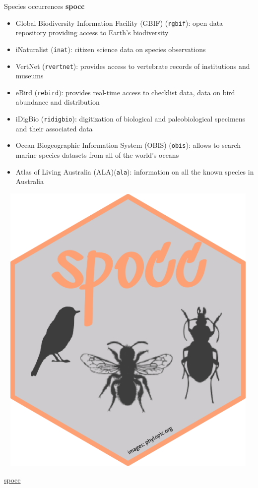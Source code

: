 \documentclass[
  ignorenonframetext,
]{beamer}
\providecommand{\tightlist}{%
  \setlength{\itemsep}{0pt}\setlength{\parskip}{0pt}}\usepackage{longtable,booktabs,array}
\begin{document}
\begin{frame}[fragile]{Species occurrences}
\label{species-occurrences-4}
\textbf{spocc}

\begin{itemize}
\tightlist
\item
  Global Biodiversity Information Facility (GBIF) (\texttt{rgbif}): open
  data repository providing access to Earth's biodiversity
\item
  iNaturalist (\texttt{inat}): citizen science data on species
  observations
\item
  VertNet (\texttt{rvertnet}): provides access to vertebrate records of
  institutions and museums
\item
  eBird (\texttt{rebird}): provides real-time access to checklist data,
  data on bird abundance and distribution
\item
  iDigBio (\texttt{ridigbio}): digitization of biological and
  paleobiological specimens and their associated data
\item
  Ocean Biogeographic Information System (OBIS) (\texttt{obis}): allows
  to search marine species datasets from all of the world's oceans
\item
  Atlas of Living Australia (ALA)(\texttt{ala}): information on all the
  known species in Australia
\end{itemize}

\includegraphics[width=5.20833in,height=5.72917in]{img/sdm_occ_spocc.png}

\href{https://docs.ropensci.org/spocc/}{spocc}
\end{frame}
\end{document}
